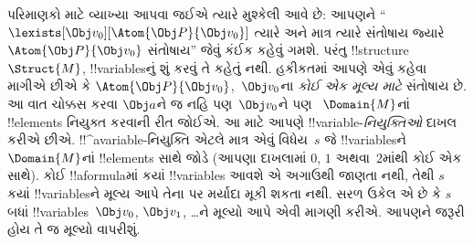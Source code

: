\documentclass[../../../include/open-logic-section]{subfiles}
\begin{document}
પરિમાણકો માટે વ્યાખ્યા આપવા જઈએ ત્યારે મુશ્કેલી આવે છે: આપણને
``$\lexists[\Obj v_0][\Atom{\Obj P}{\Obj v_0}]$ ત્યારે અને માત્ર
ત્યારે સંતોષાય જ્યારે $\Atom{\Obj P}{\Obj v_0}$ સંતોષાય'' જેવું કંઈક
કહેવું ગમશે. પરંતુ !!{structure}~$\Struct{M}$, !!{variable}sનું શું
કરવું તે કહેતું નથી. હકીકતમાં આપણે એવું કહેવા માગીએ છીએ કે
$\Atom{\Obj P}{\Obj v_0}$,~$\Obj v_0$ના \emph{કોઈ એક મૂલ્ય માટે}
સંતોષાય છે. આ વાત ચોક્કસ કરવા $\Obj a$ને જ નહિ પણ~$\Obj v_0$ને પણ
~$\Domain{M}$નાં !!{element}s નિયુક્ત કરવાની રીત જોઈએ. આ માટે આપણે
!!{variable}-\emph{નિયુક્તિઓ} દાખલ કરીએ છીએ. !!^a{variable}-નિયુક્તિ
એટલે માત્ર એવું વિધેય~$s$ જે !!{variable}sને~$\Domain{M}$નાં
!!{element}s સાથે જોડે (આપણા દાખલામાં $0$, $1$ અથવા~$2$માંથી કોઈ એક
સાથે). કોઈ !!a{formula}માં કયાં !!{variable}s આવશે એ અગાઉથી જાણતા નથી,
તેથી $s$ કયાં !!{variable}sને મૂલ્ય આપે તેના પર મર્યાદા મૂકી શકતા નથી.
સરળ ઉકેલ એ છે કે $s$ બધાં !!{variable}s~$\Obj v_0$, $\Obj v_1$,
\dots{}ને મૂલ્યો આપે એવી માગણી કરીએ\@. આપણને જરૂરી હોય તે જ મૂલ્યો
વાપરીશું.
\end{document}

